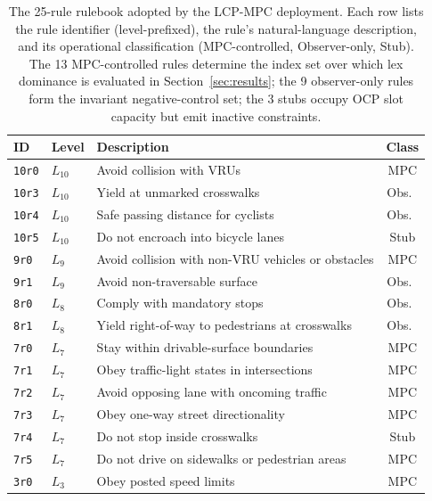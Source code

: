 \begin{table}[t]
    \centering
    \caption{The 25-rule rulebook adopted by the LCP-MPC deployment. Each row lists the rule identifier (level-prefixed), the rule's natural-language description, and its operational classification (MPC-controlled, Observer-only, Stub). The 13 MPC-controlled rules determine the index set over which lex dominance is evaluated in Section~\ref{sec:results}; the 9 observer-only rules form the invariant negative-control set; the 3 stubs occupy OCP slot capacity but emit inactive constraints.}
    \label{tab:rulebook}
    \footnotesize
    \begin{tabularx}{\linewidth}{@{}l l X c@{}}
        \toprule
        ID & Level & Description & Class \\
        \midrule
        \texttt{10r0} & $L_{10}$ & Avoid collision with VRUs & MPC \\
        \texttt{10r3} & $L_{10}$ & Yield at unmarked crosswalks & Obs.\ \\
        \texttt{10r4} & $L_{10}$ & Safe passing distance for cyclists & Obs.\ \\
        \texttt{10r5} & $L_{10}$ & Do not encroach into bicycle lanes & Stub \\
        \midrule
        \texttt{9r0}  & $L_{9}$  & Avoid collision with non-VRU vehicles or obstacles & MPC \\
        \texttt{9r1}  & $L_{9}$  & Avoid non-traversable surface & Obs.\ \\
        \midrule
        \texttt{8r0}  & $L_{8}$  & Comply with mandatory stops & Obs.\ \\
        \texttt{8r1}  & $L_{8}$  & Yield right-of-way to pedestrians at crosswalks & Obs.\ \\
        \midrule
        \texttt{7r0}  & $L_{7}$  & Stay within drivable-surface boundaries & MPC \\
        \texttt{7r1}  & $L_{7}$  & Obey traffic-light states in intersections & MPC \\
        \texttt{7r2}  & $L_{7}$  & Avoid opposing lane with oncoming traffic & MPC \\
        \texttt{7r3}  & $L_{7}$  & Obey one-way street directionality & MPC \\
        \texttt{7r4}  & $L_{7}$  & Do not stop inside crosswalks & Stub \\
        \texttt{7r5}  & $L_{7}$  & Do not drive on sidewalks or pedestrian areas & MPC \\
        \midrule
        \texttt{3r0}  & $L_{3}$  & Obey posted speed limits & MPC \\

\end{tabularx}
\end{table}

